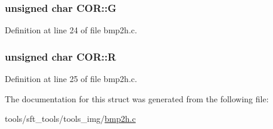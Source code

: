 \hypertarget{structCOR_ac120339669430e3da80992d85dc3e989}{
\subsubsection[{G}]{\setlength{\rightskip}{0pt plus 5cm}unsigned char {\bf COR::G}}}
\label{structCOR_ac120339669430e3da80992d85dc3e989}


Definition at line 24 of file bmp2h.c.

\hypertarget{structCOR_a14d6d522c67f55b70b63023359363af7}{
\subsubsection[{R}]{\setlength{\rightskip}{0pt plus 5cm}unsigned char {\bf COR::R}}}
\label{structCOR_a14d6d522c67f55b70b63023359363af7}


Definition at line 25 of file bmp2h.c.



The documentation for this struct was generated from the following file:\begin{DoxyCompactItemize}
\item 
tools/sft\_\-tools/tools\_\-img/\hyperlink{bmp2h_8c}{bmp2h.c}\end{DoxyCompactItemize}
